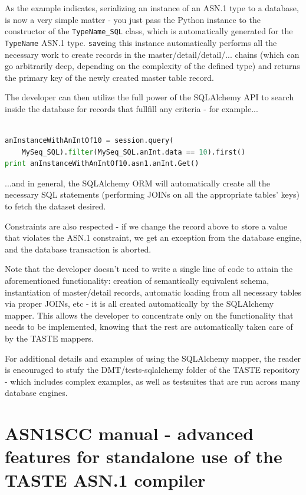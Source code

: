 \documentclass[11pt]{book}
\begin{document}
As the example indicates, serializing an instance of an ASN.1 type to
a database, is now a very simple matter - you just pass the Python instance
to the constructor of the {\tt TypeName\_SQL} class, which is automatically
generated for the {\tt TypeName} ASN.1 type. {\tt save}ing this instance 
automatically performs all the necessary work to create records in
the master/detail/detail/... chains (which can go arbitrarily deep,
depending on the complexity of the defined type) and returns the primary
key of the newly created master table record.

The developer can then utilize the full power of the SQLAlchemy API
to search inside the database for records that fullfill any criteria - for 
example...

\begin{lstlisting}[language=Python]

anInstanceWithAnIntOf10 = session.query(
    MySeq_SQL).filter(MySeq_SQL.anInt.data == 10).first()
print anInstanceWithAnIntOf10.asn1.anInt.Get()
\end{lstlisting}

...and in general, the SQLAlchemy ORM will automatically create 
all the necessary SQL statements (performing JOINs on all the
appropriate tables' keys) to fetch the dataset desired.

Constraints are also respected - if we change the record above to store
a value that violates the ASN.1 constraint, we get an exception from
the database engine, and the database transaction is aborted.

Note that the developer doesn't need to write a single line of code
to attain the aforementioned functionality: creation of semantically
equivalent schema, instantiation of master/detail records, automatic
loading from all necessary tables via proper JOINs, etc - it is all created
automatically by the SQLAlchemy mapper. This allows the developer to concentrate
only on the functionality that needs to be implemented, knowing that
the rest are automatically taken care of by the TASTE mappers.

For additional details and examples of using the SQLAlchemy  mapper,
the reader is encouraged to stufy the DMT/tests-sqlalchemy folder
of the TASTE repository - which includes complex examples, as well
as testsuites that are run across many database engines.

\chapter{ASN1SCC manual - advanced features for standalone use of the TASTE ASN.1 compiler}
\end{document}

